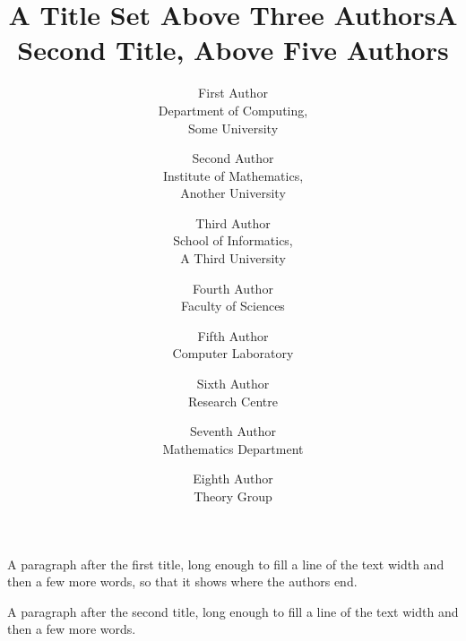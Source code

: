 \documentclass{article}
\title{A Title Set Above Three Authors}
\author{First Author \\ Department of Computing,\\ Some University
\and Second Author \\ Institute of Mathematics,\\ Another University
\and Third Author \\ School of Informatics,\\ A Third University}
\date{}
\makeatletter
\let\keptmaketitle\maketitle \let\kept@maketitle\@maketitle \let\keptand\and
\let\kepttitle\title \let\keptauthor\author \let\keptdate\date
\newcommand\secondtitle[2]{\let\maketitle\keptmaketitle \let\@maketitle\kept@maketitle
  \let\and\keptand \kepttitle{#1}\keptauthor{#2}\keptdate{}%
  {\let\newpage\relax \maketitle}\thispagestyle{empty}}
\makeatother
\begin{document}
\maketitle
\thispagestyle{empty}
A paragraph after the first title, long enough to fill a line of the text width and then a few more words, so that it shows where the authors end.

\secondtitle{A Second Title, Above Five Authors}{Fourth Author \\ Faculty of Sciences
\and Fifth Author \\ Computer Laboratory
\and Sixth Author \\ Research Centre
\and Seventh Author \\ Mathematics Department
\and Eighth Author \\ Theory Group}
A paragraph after the second title, long enough to fill a line of the text width and then a few more words.
\end{document}
